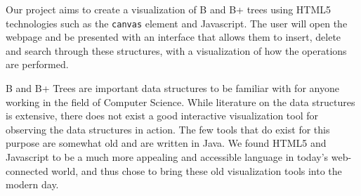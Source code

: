 
Our project aims to create a visualization of B and B+ trees using HTML5
technologies such as the \texttt{canvas} element and Javascript. The user will open the
webpage and be presented with an interface that allows them to insert, delete
and search through these structures, with a visualization of how the
operations are performed.

B and B+ Trees are important data structures to be familiar with for
anyone working in the field of Computer Science. While literature on
the data structures is extensive, there does not exist a good
interactive visualization tool for observing the data structures in
action. The few tools that do exist for this purpose are somewhat old
and are written in Java. We found HTML5 and Javascript to be a much
more appealing and accessible language in today's web-connected world,
and thus chose to bring these old visualization tools into the modern day.

